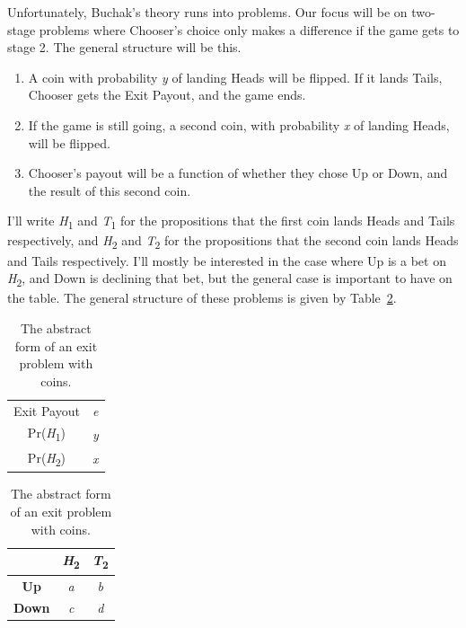 \documentclass[
  12pt,
  letterpaper,
  DIV=11,
  numbers=noendperiod]{scrreprt}
\providecommand{\tightlist}{%
  \setlength{\itemsep}{0pt}\setlength{\parskip}{0pt}}\usepackage{longtable,booktabs,array}
\begin{document}
Unfortunately, Buchak's theory runs into problems. Our focus will be on
two-stage problems where Chooser's choice only makes a difference if the
game gets to stage 2. The general structure will be this.

\begin{enumerate}
\def\labelenumi{\arabic{enumi}.}
\tightlist
\item
  A coin with probability \emph{y} of landing Heads will be flipped. If
  it lands Tails, Chooser gets the Exit Payout, and the game ends.
\item
  If the game is still going, a second coin, with probability \emph{x}
  of landing Heads, will be flipped.
\item
  Chooser's payout will be a function of whether they chose Up or Down,
  and the result of this second coin.
\end{enumerate}

I'll write \emph{H}\textsubscript{1} and \emph{T}\textsubscript{1} for
the propositions that the first coin lands Heads and Tails respectively,
and \emph{H}\textsubscript{2} and \emph{T}\textsubscript{2} for the
propositions that the second coin lands Heads and Tails respectively.
I'll mostly be interested in the case where Up is a bet on
\emph{H}\textsubscript{2}, and Down is declining that bet, but the
general case is important to have on the table. The general structure of
these problems is given by Table~\ref{tbl-general-coin-exit}.

\begin{table}

\caption{\label{tbl-general-coin-exit}The abstract form of an exit
problem with coins.}\begin{minipage}[t]{0.50\linewidth}

{\centering 

\begin{tabular}[t]{cc}
\toprule
Exit Payout & \emph{e}\\
Pr(\emph{H}\textsubscript{1}) & \emph{y}\\
Pr(\emph{H}\textsubscript{2}) & \emph{x}\\
\bottomrule
\end{tabular}

}

\end{minipage}%
%
\begin{minipage}[t]{0.50\linewidth}

{\centering 

\begin{tabular}[t]{ccc}
\toprule
 & \textbf{\emph{H}}\textsubscript{\textbf{2}} & \textbf{\emph{T}}\textsubscript{\textbf{2}}\\
\midrule
\textbf{Up} & \emph{a} & \emph{b}\\
\textbf{Down} & \emph{c} & \emph{d}\\
\bottomrule
\end{tabular}

}

\end{minipage}%

\end{table}
\end{document}
